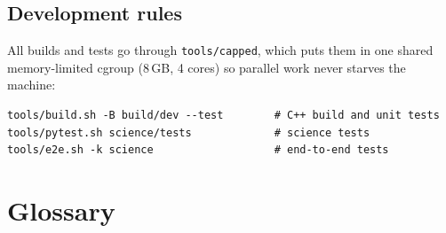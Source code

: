 \documentclass[11pt,a4paper]{report}
\newcommand{\code}[1]{\texttt{#1}}
\begin{document}
\section{Development rules}

All builds and tests go through \code{tools/capped}, which puts them in one shared memory-limited
cgroup (8\,GB, 4 cores) so parallel work never starves the machine:
\begin{lstlisting}
tools/build.sh -B build/dev --test        # C++ build and unit tests
tools/pytest.sh science/tests             # science tests
tools/e2e.sh -k science                   # end-to-end tests
\end{lstlisting}

\appendix
\chapter{Glossary}
\end{document}
